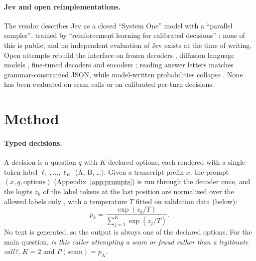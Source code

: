 \documentclass[11pt]{article}
\begin{document}
\paragraph{Jev and open reimplementations.} The vendor describes Jev as a closed ``System One'' model with a ``parallel sampler'', trained by ``reinforcement learning for calibrated decisions'' \citep{typesafe2026jev}; none of this is public, and no independent evaluation of Jev exists at the time of writing. Open attempts rebuild the interface on frozen decoders \citep{semif2026,openjevsglang2026}, diffusion language models \citep{vllm57250}, fine-tuned decoders \citep{nimble2026} and encoders \citep{laya2026}; reading answer letters matches grammar-constrained JSON, while model-written probabilities collapse \citep{minijev2026}. None has been evaluated on scam calls or on calibrated per-turn decisions.

\section{Method}

\paragraph{Typed decisions.} A decision is a question $q$ with $K$ declared options, each rendered with a single-token label $\ell_1,\dots,\ell_K$ (A, B, \ldots). Given a transcript prefix $x$, the prompt $(x, q, \text{options})$ (Appendix~\ref{app:prompts}) is run through the decoder once, and the logits $z_k$ of the label tokens at the last position are normalized over the allowed labels only \citep{zhao2021calibrate,holtzman2021surface}, with a temperature $T$ fitted on validation data (below):
\begin{equation}\label{eq:softmax}
p_k = \frac{\exp(z_k/T)}{\sum_{j=1}^{K}\exp(z_j/T)} .
\end{equation}
No text is generated, so the output is always one of the declared options. For the main question, \emph{is this caller attempting a scam or fraud rather than a legitimate call?}, $K=2$ and $P(\text{scam}) = p_{\text{A}}$.
\end{document}
